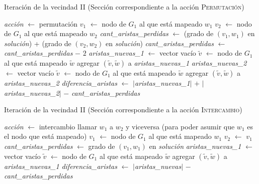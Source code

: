 \begin{algorithm}[H]
    \SetAlgoVlined
    \caption{Iteración de la vecindad II (Sección correspondiente a la acción \textsc{Permutación})}
    \textit{acción} $\gets$ \textsf{permutación} \;
    $v_1$ $\gets$ nodo de $G_1$ al que está mapeado $w_1$ \;
    $v_2$ $\gets$ nodo de $G_1$ al que está mapeado $w_2$ \;
    \textit{cant\_aristas\_perdidas} $\gets$ (grado de $(v_1, w_1)$ en \textit{solución}) +
        (grado de $(v_2, w_2)$ en \textit{solución}) \;
     {
        \textit{cant\_aristas\_perdidas} $\gets$ \textit{cant\_aristas\_perdidas} $-$ $2$ \;
    }
    \textit{aristas\_nuevas\_1} $\gets$ vector vacío \;
     {
         {
            $\tilde{v}$ $\gets$ nodo de $G_1$ al que está mapeado $\tilde{w}$ \;
             {
                agregar $(\tilde{v}, \tilde{w})$ a \textit{aristas\_nuevas\_1} \;
            }
        }
    }
    \textit{aristas\_nuevas\_2} $\gets$ vector vacío \;
     {
         {
            $\tilde{v}$ $\gets$ nodo de $G_1$ al que está mapeado $\tilde{w}$ \;
             {
                agregar $(\tilde{v}, \tilde{w})$ a \textit{aristas\_nuevas\_2} \;
            }
        }
    }
    \textit{diferencia\_aristas} $\gets$ $\vert$\textit{aristas\_nuevas\_1}$\vert$ $+$
        $\vert$\textit{aristas\_nuevas\_2}$\vert$ $-$ \textit{cant\_aristas\_perdidas} \;
\end{algorithm}
\bigskip

\begin{algorithm}[H]
    \SetAlgoVlined
    \caption{Iteración de la vecindad II (Sección correspondiente a la acción \textsc{Intercambio})}
    \textit{acción} $\gets$ \textsf{intercambio} \;
     {
        llamar $w_1$ a $w_2$ y viceversa (para poder asumir
            que $w_1$ es el nodo que está mapeado) \;
    }
    $v_1$ $\gets$ nodo de $G_1$ al que está mapeado $w_1$ \;
    $v_2$ $\gets$ $v_1$ \;
    \textit{cant\_aristas\_perdidas} $\gets$ grado de $(v_1, w_1)$ en \textit{solución} \;
    \textit{aristas\_nuevas\_1} $\gets$ vector vacío \;
     {
         {
            $\tilde{v}$ $\gets$ nodo de $G_1$ al que está mapeado $\tilde{w}$ \;
             {
                agregar $(\tilde{v}, \tilde{w})$ a \textit{aristas\_nuevas\_1} \;
            }
        }
    }
    \textit{diferencia\_aristas} $\gets$ $\vert$\textit{aristas\_nuevas}$\vert$
        $-$ \textit{cant\_aristas\_perdidas} \;
\end{algorithm}

